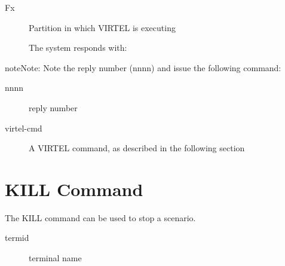 \documentclass[letterpaper,10pt,english]{sphinxmanual}
\begin{document}
\begin{sphinxVerbatim}[commandchars=\\\{\}]
 
\end{sphinxVerbatim}
\begin{description}
\item[{Fx}] \leavevmode
Partition in which VIRTEL is executing

The system responds with:

\end{description}

\begin{sphinxVerbatim}[commandchars=\\\{\}]
   
 
\end{sphinxVerbatim}

\begin{sphinxadmonition}{note}{Note:}
Note the reply number (nnnn) and issue the following command:
\end{sphinxadmonition}

\begin{sphinxVerbatim}[commandchars=\\\{\}]
 
\end{sphinxVerbatim}
\begin{description}
\item[{nnnn}] \leavevmode
reply number

\item[{virtel-cmd}] \leavevmode
A VIRTEL command, as described in the following section

\end{description}

\newpage


\section{KILL Command}
\label{\detokenize{audit_operations_ and_performance:kill-command}}\label{\detokenize{audit_operations_ and_performance:index-3}}
The KILL command can be used to stop a scenario.

\begin{sphinxVerbatim}[commandchars=\\\{\}]
\end{sphinxVerbatim}
\begin{description}
\item[{termid}] \leavevmode
terminal name

\end{description}
\end{document}
